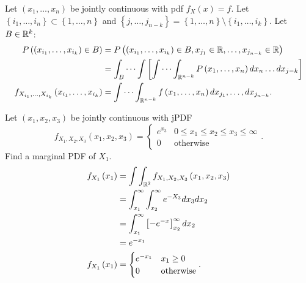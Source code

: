 \begin{definition}
	Let $\left( x_1, \ldots , x_{n} \right) $ be jointly continuous with pdf $f_X \left( x \right) = f$. Let $\left\{ i_1, \ldots, i_{n} \right\} \subset \left\{ 1, \ldots, n \right\} $ and $\left\{ j, \ldots, j_{n - k} \right\}  = \left\{ 1, \ldots , n \right\} \setminus \left\{ i_{1}, \ldots, i_{k}\right\}$. Let $B \in  \mathbb{R}^{k}$: 
	\begin{align*}
		P\left( \left( x_{i_{1}}, \ldots,  x_{i_{k}}\right) \in B \right)  
		&= P \left( \left( x_{i_{1}}, \ldots, x_{i_{k}}  \right) \in B, x _{j_{1}} \in  \mathbb{R}, \ldots, x_{j_{n-k}} \in  \mathbb{R} \right)  \\
		&= \int_{B} \cdots \int \left[ \int \cdots \int_{\mathbb{R}^{n - k}} P \left( x_1, \ldots, x_{n} \right) dx_{n} \ldots dx_{j - k} \right] \\
		f_{X_{i_{1}}, \ldots, X_{i_{k}}} \left( x_{i_{1}}, \ldots, x_{i_{k}} \right) 
		&= \int \cdots \int_{\mathbb{R} ^{n - k}} f\left( x_{1}, \ldots, x_{n} \right)  dx_{j_{1}}, \ldots, dx_{j_{n-k}}
	.\end{align*}
\end{definition}

\begin{example}
	Let $\left( x_1, x_2, x_3 \right) $ be jointly continuous with jPDF 
	\[
		f_{X_1, X_2, X_3} \left( x_1, x_2, x_3 \right) =
		\begin{cases}
			e^{x_3} & 0 \le x_1\le x_2\le  x_3\le  \infty \\
			0 & \text{otherwise}
		\end{cases}		
	.\]  
	Find a marginal PDF of $X_1$. 
	\begin{align*}
		f_{X_1} \left( x_1 \right)  &= \int \int_{\mathbb{R}^2} f_{X_1, X_2, X_3} \left( x_1, x_2, x_3 \right) \\
		&= \int_{x_1}^{\infty} \int_{x_2}^{\infty}  e^{-X_3}dx_3 dx_2 \\
		&= \int_{x_1}^{\infty} \left[ -e^{-x} \right] _{x_2}^{\infty} dx_2 \\
		&= e^{-x_1} \\
		f_{X_1}\left( x_1 \right)  &=
		\begin{cases}
			e^{-x_1} & x_1 \ge   0 \\
			0 & \text{otherwise}
		\end{cases}
	.\end{align*}
\end{example}
